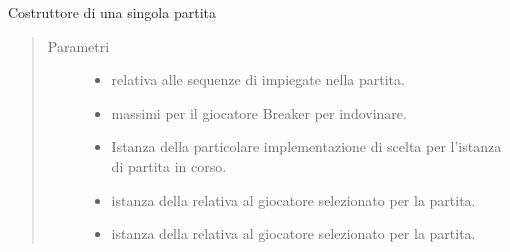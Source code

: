 \documentclass[letterpaper,10pt,italian,openany,oneside]{sphinxmanual}
\begin{document}
\begin{fulllineitems}
\label{\detokenize{test/it/unicam/cs/pa/mastermind/gamecore/SingleMatch:it.unicam.cs.pa.mastermind.gamecore.SingleMatch.SingleMatch(int, int, GameViewFactory, BreakerFactory, MakerFactory)}}
Costruttore di una singola partita
\begin{quote}\begin{description}
\item[{Parametri}] \leavevmode\begin{itemize}
\item {} 
 \textendash{} relativa alle sequenze di  impiegate nella partita.

\item {} 
 \textendash{} massimi per il giocatore Breaker per indovinare.

\item {} 
 \textendash{} Istanza della particolare implementazione di  scelta per l’istanza di partita in corso.

\item {} 
 \textendash{} istanza della  relativa al giocatore  selezionato per la partita.

\item {} 
 \textendash{} istanza della  relativa al giocatore  selezionato per la partita.

\end{itemize}

\end{description}\end{quote}

\end{fulllineitems}
\end{document}
